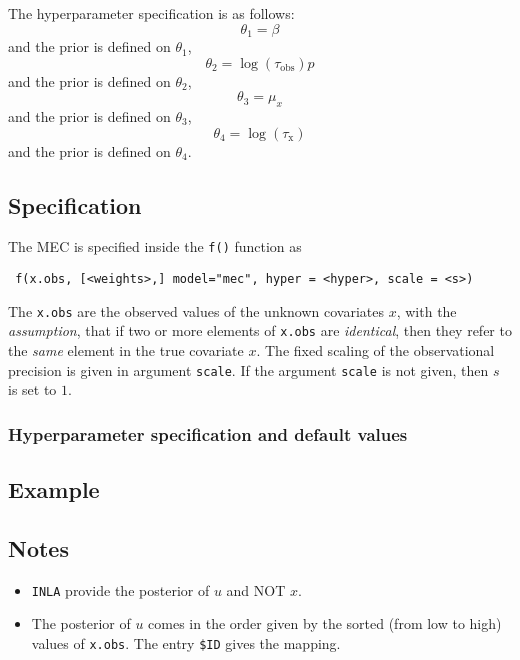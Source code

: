 \documentclass[a4paper,11pt]{article}
\begin{document}
The hyperparameter specification is as follows:
\begin{displaymath}
    \theta_{1} = \beta
\end{displaymath}
and the prior is defined on $\theta_{1}$,
\begin{displaymath}
    \theta_{2} = \log(\tau_{\text{obs}})
p\end{displaymath}
and the prior is defined on $\theta_{2}$,
\begin{displaymath}
    \theta_{3} = \mu_{x}
\end{displaymath}
and the prior is defined on $\theta_{3}$,
\begin{displaymath}
    \theta_{4} = \log(\tau_{\text{x}})
\end{displaymath}
and the prior is defined on $\theta_{4}$.


\subsection*{Specification}

The MEC is specified inside the {\tt f()}
function as
\begin{verbatim}
 f(x.obs, [<weights>,] model="mec", hyper = <hyper>, scale = <s>)
\end{verbatim}

The \texttt{x.obs} are the observed values of the unknown covariates
$x$, with the \emph{assumption}, that if two or more elements of
\texttt{x.obs} are \emph{identical}, then they refer to the
\emph{same} element in the true covariate $x$. The fixed scaling of
the observational precision is given in argument \texttt{scale}. If
the argument \texttt{scale} is not given, then $s$ is set to $1$.


\subsubsection*{Hyperparameter specification and default values}


\subsection*{Example}



\subsection*{Notes}

\begin{itemize}
\item \texttt{INLA} provide the posterior of $u$ and NOT $x$.
\item The posterior of $u$ comes in the order given by the sorted
    (from low to high) values of \texttt{x.obs}. The entry \verb|$ID|
    gives the mapping.
\end{itemize}
\end{document}
